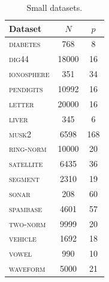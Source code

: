 \begin{table}
    \centering
    \footnotesize
    \begin{tabular}{| l | c c |}
    \hline
    \textbf{Dataset} & $N$ & $p$ \\
    \hline
    \hline
        \textsc{diabetes}    & 768       & 8         \\
        \textsc{dig44}       & 18000     & 16        \\
        \textsc{ionosphere}  & 351       & 34        \\
        \textsc{pendigits}   & 10992     & 16        \\
        \textsc{letter}      & 20000     & 16        \\
        \textsc{liver}       & 345       & 6         \\
        \textsc{musk2}       & 6598      & 168       \\
        \textsc{ring-norm}   & 10000     & 20        \\
        \textsc{satellite}   & 6435      & 36        \\
        \textsc{segment}     & 2310      & 19        \\
        \textsc{sonar}       & 208       & 60        \\
        \textsc{spambase}    & 4601      & 57        \\
        \textsc{two-norm}    & 9999      & 20        \\
        \textsc{vehicle}     & 1692      & 18        \\
        \textsc{vowel}       & 990       & 10        \\
        \textsc{waveform}    & 5000      & 21        \\
    \hline
    \end{tabular}
    \caption{Small datasets.}
    \label{table:rp:small-data}
\end{table}

